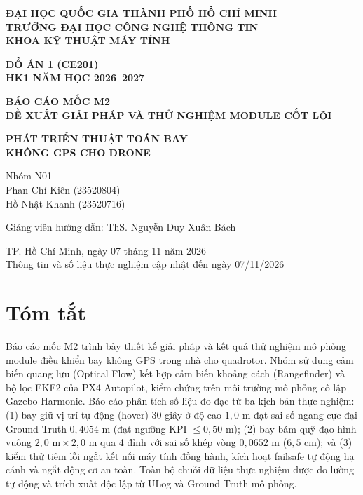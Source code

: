 \documentclass[a4paper,12pt]{article}
\begin{document}
\hypersetup{pageanchor=false}
\begin{titlepage}
\centering
\textbf{ĐẠI HỌC QUỐC GIA THÀNH PHỐ HỒ CHÍ MINH}\\
\textbf{TRƯỜNG ĐẠI HỌC CÔNG NGHỆ THÔNG TIN}\\
\textbf{KHOA KỸ THUẬT MÁY TÍNH}
\vspace{2.0cm}

\textbf{ĐỒ ÁN 1 (CE201)}\\
\textbf{HK1 NĂM HỌC 2026--2027}
\vspace{1.2cm}

\textbf{BÁO CÁO MỐC M2}\\
\textbf{ĐỀ XUẤT GIẢI PHÁP VÀ THỬ NGHIỆM MODULE CỐT LÕI}
\vspace{0.8cm}

\textbf{PHÁT TRIỂN THUẬT TOÁN BAY}\\
\textbf{KHÔNG GPS CHO DRONE}
\vspace{1.5cm}

Nhóm N01\\
Phan Chí Kiên (23520804)\\
Hồ Nhật Khanh (23520716)
\vspace{0.8cm}

Giảng viên hướng dẫn: ThS. Nguyễn Duy Xuân Bách
\vfill

TP. Hồ Chí Minh, ngày 07 tháng 11 năm 2026\\
Thông tin và số liệu thực nghiệm cập nhật đến ngày 07/11/2026
\end{titlepage}

\tableofcontents
\newpage
\listoftables
\vspace{0.5cm}
\listoffigures
\newpage

\hypersetup{pageanchor=true}

\section*{Tóm tắt}
Báo cáo mốc M2 trình bày thiết kế giải pháp và kết quả thử nghiệm mô phỏng module điều khiển bay không GPS trong nhà cho quadrotor. Nhóm sử dụng cảm biến quang lưu (Optical Flow) kết hợp cảm biến khoảng cách (Rangefinder) và bộ lọc EKF2 của PX4 Autopilot, kiểm chứng trên môi trường mô phỏng cô lập Gazebo Harmonic. Báo cáo phân tích số liệu đo đạc từ ba kịch bản thực nghiệm: (1) bay giữ vị trí tự động (hover) 30 giây ở độ cao $1{,}0\text{ m}$ đạt sai số ngang cực đại Ground Truth $0{,}4054\text{ m}$ (đạt ngưỡng KPI $\le 0{,}50\text{ m}$); (2) bay bám quỹ đạo hình vuông $2{,}0\text{ m} \times 2{,}0\text{ m}$ qua 4 đỉnh với sai số khép vòng $0{,}0652\text{ m}$ ($6{,}5\text{ cm}$); và (3) kiểm thử tiêm lỗi ngắt kết nối máy tính đồng hành, kích hoạt failsafe tự động hạ cánh và ngắt động cơ an toàn. Toàn bộ chuỗi dữ liệu thực nghiệm được đo lường tự động và trích xuất độc lập từ ULog và Ground Truth mô phỏng.
\end{document}
